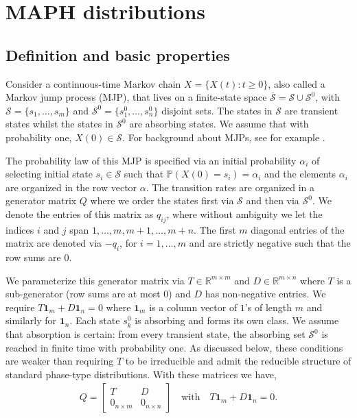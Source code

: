 \documentclass{article}
\newcommand{\R}{\mathbb{R}}
\newcommand{\Prob}{\mathbb{P}}
\newcommand{\cs}{\mathcal{S}}
\begin{document}
\section{MAPH distributions}
\label{sec:maph-dist}

\subsection{Definition and basic properties}
Consider a continuous-time Markov chain $X=\{X(t):t\geq 0\}$, also called a Markov jump process (MJP),  that lives on a finite-state space $\overline{\mathcal{S}}=\mathcal{S}\cup \mathcal{S}^0$, with $\cs = \{s_1,\ldots,s_m\}$ and  $\mathcal{S}^0=\{s^0_1,\ldots,s^0_n\}$ disjoint sets. The states in $\cs$ are transient states whilst the states in $\cs^{0}$ are absorbing states. We assume that with probability one, $X(0) \in \cs$. For background about MJPs, see for example \citet{norris97}.

The probability law of this MJP is specified via an initial probability $\alpha_i$ of selecting initial state $s_i \in \mathcal{S}$ such that $\Prob(X(0) = s_i) = \alpha_i$ and the elements $\alpha_i$ are organized in the row vector $\alpha$. The transition rates
are organized in a generator matrix $Q$ where we order the states first via $\cs$ and then via $\cs^0$. We denote the entries of this matrix as $q_{ij}$, where without ambiguity we let the indices $i$ and $j$ span $1,\ldots,m,m+1,\ldots,m+n$. The first $m$ diagonal entries of the matrix are denoted via $-q_i$, for $i=1,\ldots,m$ and are strictly negative such that the row sums are $0$.

We parameterize this generator matrix via $T \in \R^{m \times m}$ and $D \in \R^{m \times n}$ where $T$ is a sub-generator (row sums are at most $0$) and $D$ has non-negative entries. We require $T\mathbf{1}_m + D\mathbf{1}_n=0$ where $\mathbf{1}_m$ is a column vector of $1$'s of length $m$ and similarly for $\mathbf{1}_n$. Each state $s^0_k$ is absorbing and forms its own class. We assume that absorption is certain: from every transient state, the absorbing set $\cs^0$ is reached in finite time with probability one. As discussed below, these conditions are weaker than requiring $T$ to be irreducible and admit the reducible structure of standard phase-type distributions. With these matrices we have,
%
\begin{align*}
Q=
\begin{bmatrix}
T & D\\
0_{n \times m} & 0_{n \times n}
\end{bmatrix}
\quad \textrm{with} \quad T\mathbf{1}_m + D\mathbf{1}_n=0.
\end{align*}
\end{document}
